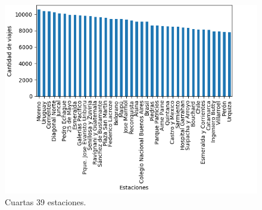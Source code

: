\begin{enumerate}
\begin{itemize}
\begin{figure}[H]
    \centering
    \includegraphics[scale=0.8]{imagenes/nombreOrigenEst4.png}
    \caption{Cuartas 39 estaciones.}
 \label{fig: cluster}
\end{figure}


\end{itemize}
\end{enumerate}
